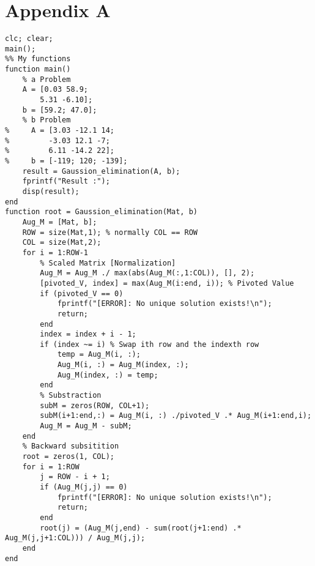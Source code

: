 \documentclass{article}
\begin{document}
\newpage
\appendix
\section{Appendix A}

\begin{lstlisting}
clc; clear;
main();
%% My functions
function main()
    % a Problem
    A = [0.03 58.9;
        5.31 -6.10];
    b = [59.2; 47.0];
    % b Problem
%     A = [3.03 -12.1 14;
%         -3.03 12.1 -7;
%         6.11 -14.2 22];
%     b = [-119; 120; -139];
    result = Gaussion_elimination(A, b);
    fprintf("Result :");
    disp(result);
end
function root = Gaussion_elimination(Mat, b)
    Aug_M = [Mat, b];
    ROW = size(Mat,1); % normally COL == ROW
    COL = size(Mat,2);
    for i = 1:ROW-1
        % Scaled Matrix [Normalization]
        Aug_M = Aug_M ./ max(abs(Aug_M(:,1:COL)), [], 2);
        [pivoted_V, index] = max(Aug_M(i:end, i)); % Pivoted Value
        if (pivoted_V == 0)
            fprintf("[ERROR]: No unique solution exists!\n");
            return;
        end
        index = index + i - 1;
        if (index ~= i) % Swap ith row and the indexth row
            temp = Aug_M(i, :);
            Aug_M(i, :) = Aug_M(index, :);
            Aug_M(index, :) = temp;
        end
        % Substraction
        subM = zeros(ROW, COL+1);
        subM(i+1:end,:) = Aug_M(i, :) ./pivoted_V .* Aug_M(i+1:end,i);
        Aug_M = Aug_M - subM;
    end
    % Backward subsitition
    root = zeros(1, COL);
    for i = 1:ROW
        j = ROW - i + 1;
        if (Aug_M(j,j) == 0)
            fprintf("[ERROR]: No unique solution exists!\n");
            return;
        end
        root(j) = (Aug_M(j,end) - sum(root(j+1:end) .* Aug_M(j,j+1:COL))) / Aug_M(j,j);
    end
end
\end{lstlisting}
\end{document}
